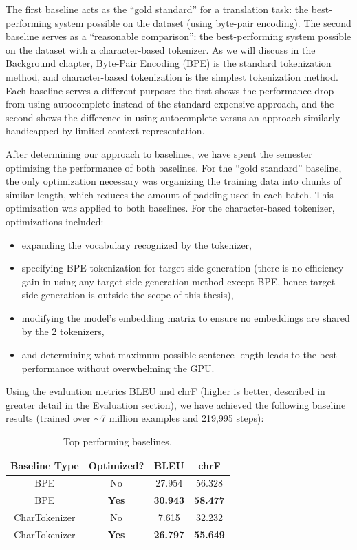 The first baseline acts as the “gold standard” for a translation task: the best-performing system possible on the dataset (using byte-pair encoding). The second baseline serves as a “reasonable comparison”: the best-performing system possible on the dataset with a character-based tokenizer. As we will discuss in the Background chapter, Byte-Pair Encoding (BPE) is the standard tokenization method, and character-based tokenization is the simplest tokenization method. Each baseline serves a different purpose: the first shows the performance drop from using autocomplete instead of the standard expensive approach, and the second shows the difference in using autocomplete versus an approach similarly handicapped by limited context representation.

After determining our approach to baselines, we have spent the semester optimizing the performance of both baselines. For the “gold standard” baseline, the only optimization necessary was organizing the training data into chunks of similar length, which reduces the amount of padding used in each batch. This optimization was applied to both baselines. For the character-based tokenizer, optimizations included:

\begin{itemize}
  \item expanding the vocabulary recognized by the tokenizer,
  \item specifying BPE tokenization for target side generation (there is no efficiency gain in using any target-side generation method except BPE, hence target-side generation is outside the scope of this thesis),
  \item modifying the model’s embedding matrix to ensure no embeddings are shared by the 2 tokenizers,
  \item and determining what maximum possible sentence length leads to the best performance without overwhelming the GPU.
\end{itemize}

Using the evaluation metrics BLEU and chrF (higher is better, described in greater detail in the Evaluation section), we have achieved the following baseline results (trained over $\sim$7 million examples and 219,995 steps):

\begin{table}[h!]
    \centering
    \begin{tabular}{|c c c c|} 
         \hline
         Baseline Type & Optimized? & BLEU & chrF \\ [0.5ex] 
         \hline\hline
         BPE & No & 27.954 & 56.328 \\ 
         BPE & \textbf{Yes} & \textbf{30.943} & \textbf{58.477} \\
         CharTokenizer & No & 7.615 & 32.232 \\
         CharTokenizer & \textbf{Yes} & \textbf{26.797} & \textbf{55.649} \\
         \hline
    \end{tabular}
    \caption{Top performing baselines.}
    \label{table:baseline_results}
\end{table}

